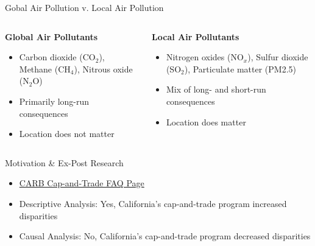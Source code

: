 \documentclass[11pt, aspectratio = 169]{beamer}
\newcommand{\1}{\mathds{1}}
\begin{document}
\begin{frame}{Gobal Air Pollution v. Local Air Pollution}
    
    \begin{columns}
    \begin{column}{0.5\textwidth}
        \textbf{Global Air Pollutants}
        \vspace*{1em}
        \begin{itemize}
            \item Carbon dioxide (CO$_2$), Methane (CH$_4$), Nitrous oxide (N$_2$O)
            \vspace*{2em}
            \item Primarily long-run consequences
            \vspace*{2em}
            \item Location does not matter
        \end{itemize}
    \end{column}
    \begin{column}{0.5\textwidth}
        \textbf{Local Air Pollutants}
        \vspace*{1em}
        \begin{itemize}
            \item Nitrogen oxides (NO$_x$), Sulfur dioxide (SO$_2$), Particulate matter (PM2.5)
            \vspace*{1em}
            \item Mix of long- and short-run consequences
            \vspace*{1em}
            \item Location does matter
        \end{itemize}
    \end{column}
    \end{columns}
    
\end{frame}
    

\begin{frame}{Motivation \& Ex-Post Research}
    
    \begin{itemize}
        \item \href{https://ww2.arb.ca.gov/resources/documents/faq-cap-and-trade-program}{CARB Cap-and-Trade FAQ Page} 
        \vfill 
        \item Descriptive Analysis: Yes, California's cap-and-trade program increased disparities \citep{cushing2018carbon, pastor2022up}
        \vfill
        \item Causal Analysis: No, California's cap-and-trade program decreased disparities \citep{hernandez2023environmental}
    \end{itemize}

\end{frame}
\end{document}

